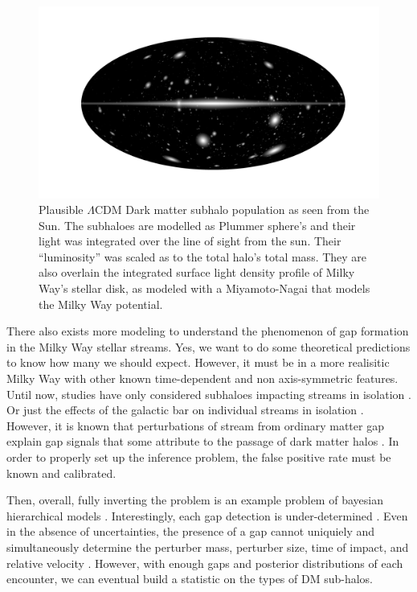         \begin{figure}
            \includegraphics[width=\linewidth]{images/mollweide-density-with-haloes.png}
            \caption[Plausible $\Lambda$CDM Dark matter subhalo population as seen from the Sun]{Plausible $\Lambda$CDM Dark matter subhalo population as seen from the Sun. The subhaloes are modelled as Plummer sphere's and their light was integrated over the line of sight from the sun. Their ``luminosity'' was scaled as to the total halo's total mass. They are also overlain the integrated surface light density profile of Milky Way's stellar disk, as modeled with a Miyamoto-Nagai that models the Milky Way potential.}
            \label{fig:mollweide-density-with-haloes.png}
        \end{figure}

        There also exists more modeling to understand the phenomenon of gap formation in the Milky Way stellar streams. Yes, we want to do some theoretical predictions to know how many we should expect. However, it must be in a more realisitic Milky Way with other known time-dependent and non axis-symmetric features. Until now, studies have only considered subhaloes impacting streams in isolation \citep{2013ApJ...775...90C,2015MNRAS.450.1136E,2016MNRAS.463..102E,2016MNRAS.457.3817S,2024arXiv241213144A,2025arXiv250207781L}. Or just the effects of the galactic bar on individual streams in isolation \citep{2016MNRAS.460..497H,2016ApJ...824..104P,2017NatAs...1..633P,2023A&A...678A.180T}. However, it is known that perturbations of stream from ordinary matter gap explain gap signals that some attribute to the passage of dark matter halos \citep{2020ApJ...891..161I}. In order to properly set up the inference problem, the false positive rate must be known and calibrated. 

        Then, overall, fully inverting the problem is an example problem of bayesian hierarchical models \citep{2020sdmm.book.....I}. Interestingly, each gap detection is under-determined \citep{2015MNRAS.450.1136E}. Even in the absence of uncertainties, the presence of a gap cannot uniquiely and simultaneously determine the perturber mass, perturber size, time of impact, and relative velocity \citep{2015MNRAS.450.1136E}. However, with enough gaps and posterior distributions of each encounter, we can eventual build a statistic on the types of DM sub-halos.  

